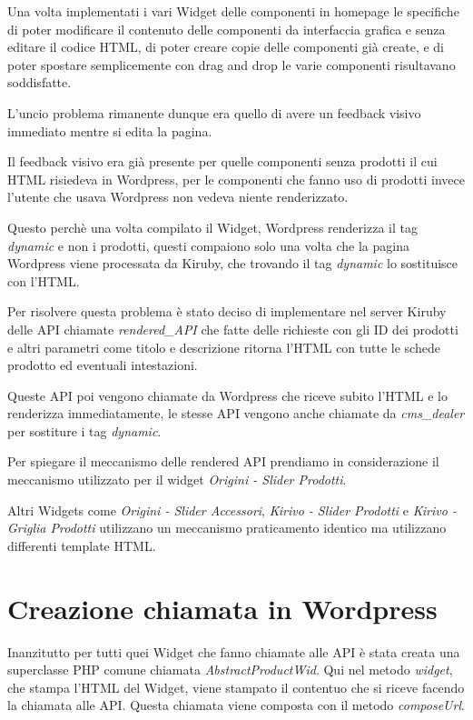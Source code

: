 


Una volta implementati i vari Widget delle componenti in homepage le specifiche di poter
modificare il contenuto delle componenti da interfaccia grafica e senza editare
il codice HTML, di poter creare copie delle componenti già create, e di poter spostare
semplicemente con drag and drop le varie componenti risultavano soddisfatte.

L'uncio problema rimanente dunque era quello di avere un feedback visivo immediato mentre si edita
la pagina.

Il feedback visivo era già presente per quelle componenti senza prodotti il cui HTML risiedeva in Wordpress,
per le componenti che fanno uso di prodotti invece l'utente che usava Wordpress non vedeva niente renderizzato.

Questo perchè una volta compilato il Widget, Wordpress renderizza il tag \emph{dynamic} e non i prodotti,
questi compaiono solo una volta che la pagina Wordpress viene processata da Kiruby, che trovando il tag \emph{dynamic}
lo sostituisce con l'HTML.

Per risolvere questa problema è stato deciso di implementare nel server Kiruby delle API chiamate
\emph{rendered\_API} che fatte delle richieste con gli ID dei prodotti e altri parametri come titolo e descrizione
ritorna l'HTML con tutte le schede prodotto ed eventuali intestazioni.

Queste API poi vengono chiamate da Wordpress che riceve subito l'HTML e lo renderizza immediatamente,
le stesse API vengono anche chiamate da \emph{cms\_dealer} per sostiture i tag \emph{dynamic}.

Per spiegare il meccanismo delle rendered API prendiamo in considerazione il meccanismo utilizzato per il widget
\emph{Origini - Slider Prodotti}.

Altri Widgets come \emph{Origini - Slider Accessori}, \emph{Kirivo - Slider Prodotti} e \emph{Kirivo - Griglia Prodotti}
utilizzano un meccanismo praticamento identico ma utilizzano differenti template HTML.

\section{Creazione chiamata in Wordpress}
Inanzitutto per tutti quei Widget che fanno chiamate alle API è stata creata una superclasse PHP comune chiamata
\emph{AbstractProductWid}.
Qui nel metodo \emph{widget}, che stampa l'HTML del Widget, viene stampato il contentuo che si riceve facendo la chiamata alle
API. Questa chiamata viene composta con il metodo \emph{composeUrl}.


